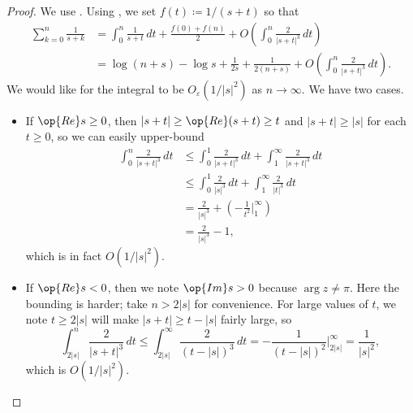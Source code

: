 \documentclass[../notes.tex]{subfiles}
\begin{document}
\begin{proof}
	We use . Using , we set $f(t)\coloneqq1/(s+t)$ so that
	\begin{align*}
		\sum_{k=0}^n\frac1{s+k} &= \int_0^n\frac1{s+t}\,dt+\frac{f(0)+f(n)}2+O\left(\int_0^n\frac2{|s+t|^3}\,dt\right) \\
		&= \log(n+s)-\log s+\frac1{2s}+\frac1{2(n+s)}+O\left(\int_0^n\frac2{|s+t|^3}\,dt\right).
	\end{align*}
	We would like for the integral to be $O_\varepsilon\left(1/|s|^2\right)$ as $n\to\infty$. We have two cases.
	\begin{itemize}
		\item If $\op{Re}s\ge0$, then $|s+t|\ge\op{Re}(s+t)\ge t$ and $|s+t|\ge|s|$ for each $t\ge0$, so we can easily upper-bound
		\begin{align*}
			\int_0^n\frac2{|s+t|^3}\,dt &\le \int_0^1\frac2{|s+t|^3}\,dt+\int_1^\infty\frac2{|s+t|^3}\,dt\\
			&\le \int_0^1\frac2{|s|^3}\,dt+\int_1^\infty\frac2{|t|^3}\,dt\\
			&= \frac2{|s|^3}+\left(-\frac1{t^2}\bigg|_{1}^\infty\right) \\
			&= \frac2{|s|^3}-1,
		\end{align*}
		which is in fact $O\left(1/|s|^2\right)$.

		\item If $\op{Re}s<0$, then we note $\op{Im}s>0$ because $\arg z\ne\pi$. Here the bounding is harder; take $n>2|s|$ for convenience. For large values of $t$, we note $t\ge2|s|$ will make $|s+t|\ge t-|s|$ fairly large, so
		\[\int_{2|s|}^n\frac2{|s+t|^3}\,dt\le\int_{2|s|}^\infty\frac2{(t-|s|)^3}\,dt=-\frac1{(t-|s|)^2}\bigg|_{2|s|}^\infty=\frac1{|s|^2},\]
		which is $O\left(1/|s|^2\right)$.
		

\end{itemize}
\end{proof}
\end{document}
